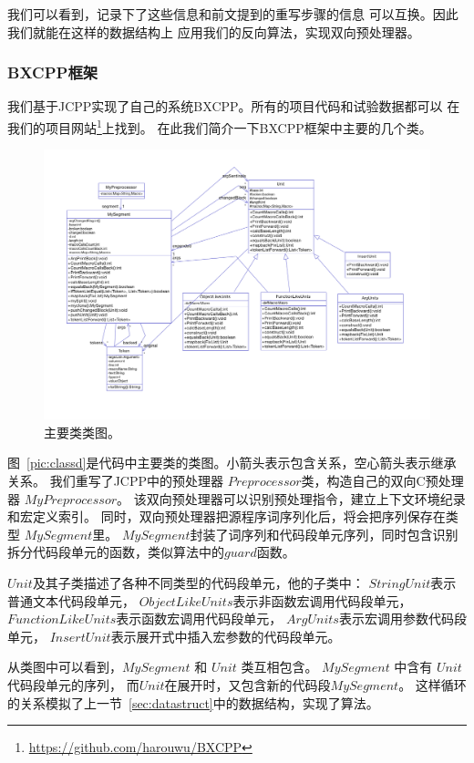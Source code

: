 我们可以看到，记录下了这些信息和前文提到的重写步骤的信息
可以互换。因此我们就能在这样的数据结构上
应用我们的反向算法，实现双向预处理器。


\subsubsection{BXCPP框架}
我们基于JCPP实现了自己的系统BXCPP。所有的项目代码和试验数据都可以
在我们的项目网站\footnote{\url{https://github.com/harouwu/BXCPP}}上找到。
在此我们简介一下BXCPP框架中主要的几个类。
\begin{figure}
\centering
\includegraphics[bb=0 0 1068 746,width=14cm]{pics/class.png}
\caption{主要类类图。}
\end{figure}
\label{pic:classd}

图~\ref{pic:classd}是代码中主要类的类图。小箭头表示包含关系，空心箭头表示继承关系。
我们重写了JCPP中的预处理器 $Preprocessor$类，构造自己的双向C预处理器 $MyPreprocessor$。
该双向预处理器可以识别预处理指令，建立上下文环境纪录和宏定义索引。
同时，双向预处理器把源程序词序列化后，将会把序列保存在类型 $MySegment$里。
$MySegment$封装了词序列和代码段单元序列，同时包含识别拆分代码段单元的函数，类似算法中的$guard$函数。


$Unit$及其子类描述了各种不同类型的代码段单元，他的子类中：
$StringUnit$表示普通文本代码段单元，
$ObjectLikeUnits$表示非函数宏调用代码段单元，
$FunctionLikeUnits$表示函数宏调用代码段单元，
$ArgUnits$表示宏调用参数代码段单元，
$InsertUnit$表示展开式中插入宏参数的代码段单元。

从类图中可以看到，$MySegment$ 和 $Unit$ 类互相包含。
$MySegment$ 中含有 $Unit$ 代码段单元的序列，
而$Unit$在展开时，又包含新的代码段$MySegment$。
这样循环的关系模拟了上一节~\ref{sec:datastruct}中的数据结构，实现了算法。

